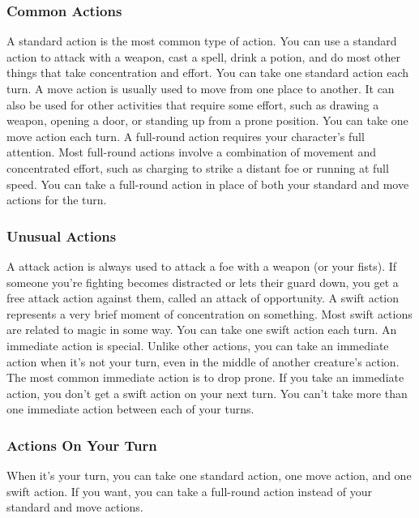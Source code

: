 \subsubsection{Common Actions}
 A standard action is the most common type of action. You can use a standard action to attack with a weapon, cast a spell, drink a potion, and do most other things that take concentration and effort. You can take one standard action each turn.
 A move action is usually used to move from one place to another. It can also be used for other activities that require some effort, such as drawing a weapon, opening a door, or standing up from a prone position. You can take one move action each turn.
 A full-round action requires your character's full attention. Most full-round actions involve a combination of movement and concentrated effort, such as charging to strike a distant foe or running at full speed. You can take a full-round action in place of both your standard and move actions for the turn.

\subsubsection{Unusual Actions}
 A attack action is always used to attack a foe with a weapon (or your fists). If someone you're fighting becomes distracted or lets their guard down, you get a free attack action against them, called an attack of opportunity.
 A swift action represents a very brief moment of concentration on something. Most swift actions are related to magic in some way. You can take one swift action each turn.
 An immediate action is special. Unlike other actions, you can take an immediate action when it's not your turn, even in the middle of another creature's action. The most common immediate action is to drop prone. If you take an immediate action, you don't get a swift action on your next turn. You can't take more than one immediate action between each of your turns.

\subsubsection{Actions On Your Turn}
When it's your turn, you can take one standard action, one move action, and one swift action. If you want, you can take a full-round action instead of your standard and move actions.

